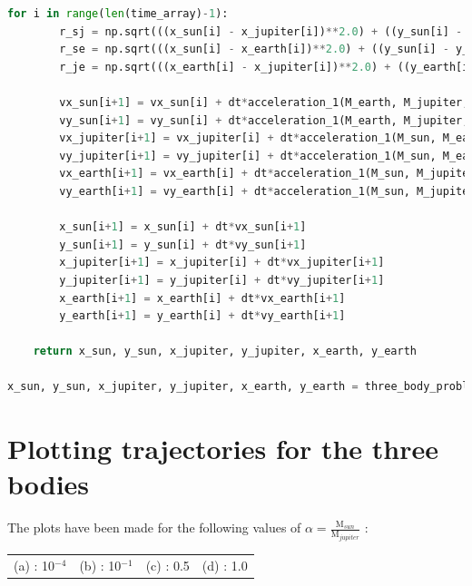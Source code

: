 \documentclass[a4paper,10pt]{article}
\begin{document}
\begin{lstlisting}[language=python]
    for i in range(len(time_array)-1):
        r_sj = np.sqrt(((x_sun[i] - x_jupiter[i])**2.0) + ((y_sun[i] - y_jupiter[i])**2.0))
        r_se = np.sqrt(((x_sun[i] - x_earth[i])**2.0) + ((y_sun[i] - y_earth[i])**2.0))
        r_je = np.sqrt(((x_earth[i] - x_jupiter[i])**2.0) + ((y_earth[i] - y_jupiter[i])**2.0))

        vx_sun[i+1] = vx_sun[i] + dt*acceleration_1(M_earth, M_jupiter, (x_sun[i] -a x_earth[i]), (x_sun[i] - x_jupiter[i]), r_se, r_sj)
        vy_sun[i+1] = vy_sun[i] + dt*acceleration_1(M_earth, M_jupiter, (y_sun[i] - y_earth[i]), (y_sun[i] - y_jupiter[i]), r_se, r_sj)
        vx_jupiter[i+1] = vx_jupiter[i] + dt*acceleration_1(M_sun, M_earth, (x_jupiter[i] - x_sun[i]), (x_jupiter[i] - x_earth[i]), r_sj, r_je)
        vy_jupiter[i+1] = vy_jupiter[i] + dt*acceleration_1(M_sun, M_earth, (y_jupiter[i] - y_sun[i]), (y_jupiter[i] - y_earth[i]), r_sj, r_je)
        vx_earth[i+1] = vx_earth[i] + dt*acceleration_1(M_sun, M_jupiter, (x_earth[i] - x_sun[i]), (x_earth[i] - x_jupiter[i]), r_se, r_je)
        vy_earth[i+1] = vy_earth[i] + dt*acceleration_1(M_sun, M_jupiter, (y_earth[i] - y_sun[i]), (y_earth[i] - y_jupiter[i]), r_se, r_je)

        x_sun[i+1] = x_sun[i] + dt*vx_sun[i+1]
        y_sun[i+1] = y_sun[i] + dt*vy_sun[i+1]
        x_jupiter[i+1] = x_jupiter[i] + dt*vx_jupiter[i+1]
        y_jupiter[i+1] = y_jupiter[i] + dt*vy_jupiter[i+1]
        x_earth[i+1] = x_earth[i] + dt*vx_earth[i+1]
        y_earth[i+1] = y_earth[i] + dt*vy_earth[i+1]

    return x_sun, y_sun, x_jupiter, y_jupiter, x_earth, y_earth

x_sun, y_sun, x_jupiter, y_jupiter, x_earth, y_earth = three_body_problem(time)

\end{lstlisting}


\vspace{80pt}

\section*{Plotting trajectories for the three bodies}
The plots have been made for the following values of $\alpha = \frac{\text{M}_{sun}}{\text{M}_{jupiter}}$ :

\begin{longtable}{c c c c}

(a) : 10$^{-4}$ & (b) : 10$^{-1}$ & (c) : 0.5 & (d) : 1.0
 
\end{longtable}
\end{document}

